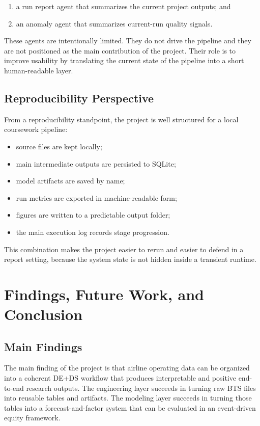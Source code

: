 \documentclass[11pt,a4paper]{article}
\begin{document}
\begin{enumerate}[leftmargin=*, label=(\roman*)]
  \item a run report agent that summarizes the current project outputs; and
  \item an anomaly agent that summarizes current-run quality signals.
\end{enumerate}

These agents are intentionally limited. They do not drive the pipeline and they
are not positioned as the main contribution of the project. Their role is to
improve usability by translating the current state of the pipeline into a short
human-readable layer.

\subsection{Reproducibility Perspective}

From a reproducibility standpoint, the project is well structured for a local
coursework pipeline:

\begin{itemize}[leftmargin=*]
  \item source files are kept locally;
  \item main intermediate outputs are persisted to SQLite;
  \item model artifacts are saved by name;
  \item run metrics are exported in machine-readable form;
  \item figures are written to a predictable output folder;
  \item the main execution log records stage progression.
\end{itemize}

This combination makes the project easier to rerun and easier to defend in a
report setting, because the system state is not hidden inside a transient
runtime.

\section{Findings, Future Work, and Conclusion}

\subsection{Main Findings}

The main finding of the project is that airline operating data can be organized
into a coherent DE+DS workflow that produces interpretable and positive
end-to-end research outputs. The engineering layer succeeds in turning raw BTS
files into reusable tables and artifacts. The modeling layer succeeds in
turning those tables into a forecast-and-factor system that can be evaluated in
an event-driven equity framework.
\end{document}
